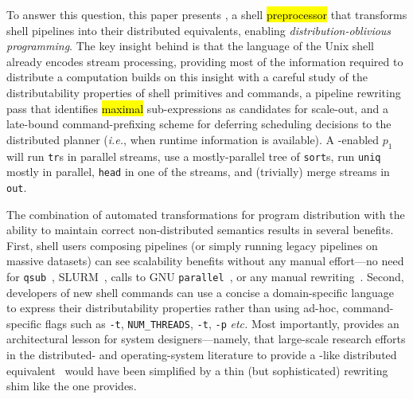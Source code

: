 \documentclass[sigplan,10pt,review,anonymous]{acmart}
\newcommand{\eg}{{\em e.g.}, }
\newcommand{\ie}{{\em i.e.}, }
\newcommand{\etc}{{\em etc.}\xspace}
\newcommand{\ttt}[1]{\texttt{\small #1}}
\newcommand{\todo}[1]{\hl{#1}\xspace}
\newcommand{\kk}[1]{[{\color{magenta}#1 --- kk}]}
\begin{document}


To answer this question, this paper presents \sys, a shell \todo{preprocessor} that transforms shell pipelines into their distributed equivalents, enabling \emph{distribution-oblivious programming}.
The key insight behind \sys is that the language of the Unix shell already encodes stream processing, providing most of the information required to distribute a computation
\sys builds on this insight with a careful study of the distributability properties of shell primitives and commands, a pipeline rewriting pass that identifies \todo{maximal} sub-expressions as candidates for scale-out, and a late-bound command-prefixing scheme for deferring scheduling decisions to the distributed planner (\ie when runtime information is available).
A \sys-enabled $p_1$ will run \ttt{tr}s in parallel streams,
  use a mostly-parallel tree of \ttt{sort}s,
  run \ttt{uniq} mostly in parallel,
  \ttt{head} in one of the streams,
  and (trivially) merge streams in \ttt{out}.

The combination of automated transformations for program distribution with the ability to maintain correct non-distributed semantics results in several benefits.
First, shell users composing pipelines (or simply running legacy pipelines on massive datasets) can see scalability benefits without any manual effort---no need for \ttt{qsub}~\cite{gentzsch2001sun}, \textsc{SLURM}~\cite{yoo2003slurm}, calls to \textsc{GNU} \ttt{parallel}~\cite{Tange2011a}, or any manual rewriting~\cite{mapreduce:08, ciel:11, spark:12}.
Second, developers of new shell commands can use a concise a domain-specific language to express their distributability properties rather than using ad-hoc, command-specific flags such as {\tt -t},  {\tt NUM\_THREADS}, \ttt{-t}, \ttt{-p} \etc
Most importantly, \sys provides an architectural lesson for system designers---namely, that large-scale research efforts in the distributed- and operating-system literature to provide a \unix-like distributed equivalent~\cite{ousterhout1988sprite, mullender1990amoeba, pike1990plan9, barak1998mosix} would have been simplified by a thin (but sophisticated) rewriting shim like the one \sys provides.
\end{document}
